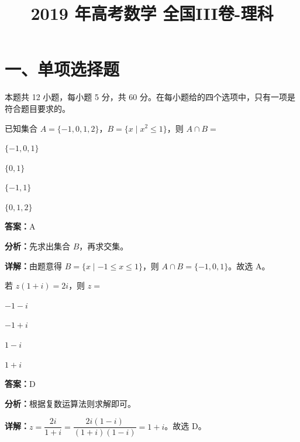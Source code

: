 ﻿\title{2019 年高考数学 全国III卷-理科}
\date{}
\maketitle

\section*{一、单项选择题}
本题共 12 小题，每小题 5 分，共 60 分。在每小题给的四个选项中，只有一项是符合题目要求的。

\begin{question}[points=5]
已知集合 $A = \{-1, 0, 1, 2\}$，$B = \{x \mid x^2 \le 1\}$，则 $A \cap B =$
\begin{choices}
  \item $\{-1,0,1\}$
  \item $\{0,1\}$
  \item $\{-1,1\}$
  \item $\{0,1,2\}$
\end{choices}
\begin{solution}
\textbf{答案：}A

\textbf{分析：}先求出集合 $B$，再求交集。

\textbf{详解：}由题意得 $B = \{x \mid -1 \le x \le 1\}$，则 $A \cap B = \{-1,0,1\}$。故选 A。
\end{solution}
\end{question}

\begin{question}[points=5]
若 $z(1+i)=2i$，则 $z=$
\begin{choices}
  \item $-1-i$
  \item $-1+i$
  \item $1-i$
  \item $1+i$
\end{choices}
\begin{solution}
\textbf{答案：}D

\textbf{分析：}根据复数运算法则求解即可。

\textbf{详解：}$z = \dfrac{2i}{1+i} = \dfrac{2i(1-i)}{(1+i)(1-i)} = 1+i$。故选 D。
\end{solution}
\end{question}

